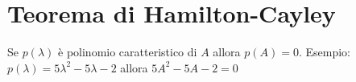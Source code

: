 \section{Teorema di Hamilton-Cayley}

Se $p(\lambda)$ è polinomio caratteristico di $A$ allora $p(A) = 0$. Esempio: $p(\lambda) = 5\lambda^2-5\lambda-2$ allora $5A^2-5A-2=0$

